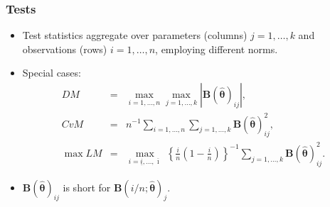 \documentclass{beamer}
\begin{document}
\begin{frame}[fragile]
  \frametitle{Tests}

\begin{itemize}
  \item Test statistics aggregate over parameters (columns) $j = 1,
    \dots, k$ and observations (rows) $i = 1, \dots, n$,
    employing different norms.
  \item Special cases:
    \begin{eqnarray*}
      \mathit{DM}      & = & \max_{i = 1,\dots, n} \max_{j = 1, \dots, k} | {\bm B}(\hat {\bm \theta})_{ij} |,\\
      \mathit{CvM}     & = & n^{-1} \sum_{i = 1,\dots, n} \sum_{j = 1, \dots, k} {\bm B}(\hat {\bm \theta})_{ij}^2, \\
      \max \mathit{LM} & = & \max_{i = \underline{i}, \dots, \overline{\imath}} ~
                             \left\{ \frac{i}{n} \left( 1 - \frac{i}{n} \right) \right\}^{-1}
                             \sum_{j = 1, \dots, k} {\bm B}(\hat {\bm \theta})_{ij}^2.
    \end{eqnarray*}
  \item ${\bm B}(\hat {\bm \theta})_{ij}$ is short for $\bm{B}(i/n; \hat{\bm{\theta}})_j$.
\end{itemize}
\end{frame}

\end{document}
